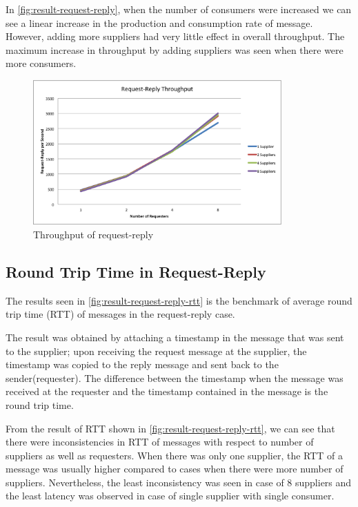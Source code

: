   In \autoref{fig:result-request-reply}, when the number of consumers were increased we can see a linear increase in the production and consumption rate of message. However, adding more suppliers had very little effect in overall throughput. The maximum increase in throughput by adding suppliers was seen when there were more consumers.
\begin{figure}[H]
  \centering
  \includegraphics[width=0.85\textwidth]{figures/09request-reply}
  \caption[Throughput of request-reply]{Throughput of request-reply}
  \label{fig:result-request-reply}
\end{figure}

\subsection{Round Trip Time in Request-Reply}
\label{subsec:request-reply-rtt}
  The results seen in \autoref{fig:result-request-reply-rtt} is the benchmark of average round trip time (RTT) of messages in the request-reply case.

  The result was obtained by attaching a timestamp in the message that was sent to the supplier; upon receiving the request message at the supplier, the timestamp was copied to the reply message and sent back to the sender(requester). The difference between the timestamp when the message was received at the requester and the timestamp contained in the message is the round trip time.

  From the result of RTT shown in \autoref{fig:result-request-reply-rtt}, we can see that there were inconsistencies in RTT of messages with respect to number of suppliers as well as requesters. When there was only one supplier, the RTT of a message was usually higher compared to cases when there were more number of suppliers. Nevertheless, the least inconsistency was seen in case of 8 suppliers and the least latency was observed in case of single supplier with single consumer.

